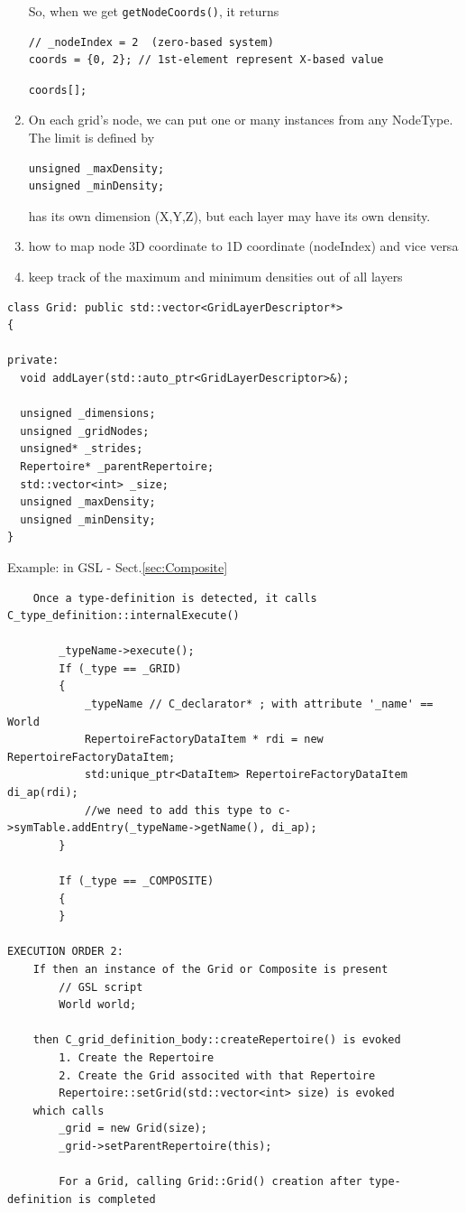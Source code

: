 \begin{enumerate}
  So, when we get \verb!getNodeCoords()!, it returns 
\begin{verbatim}
// _nodeIndex = 2  (zero-based system)
coords = {0, 2}; // 1st-element represent X-based value
\end{verbatim}
  
\begin{verbatim}
coords[];  
\end{verbatim}

  \item On each grid's node, we can put one or many instances from any NodeType.
  The limit is defined by
  
\begin{verbatim}
unsigned _maxDensity;
unsigned _minDensity;
\end{verbatim}  
  
  has its own dimension (X,Y,Z), 
  but each layer may have its own density.
  
  \item how to map node 3D coordinate to 1D coordinate (nodeIndex) and vice
  versa
  
  \item keep track of the maximum and minimum densities out of all layers

\end{enumerate}

\begin{verbatim}
class Grid: public std::vector<GridLayerDescriptor*> 
{

private:
  void addLayer(std::auto_ptr<GridLayerDescriptor>&);

  unsigned _dimensions;
  unsigned _gridNodes;
  unsigned* _strides;
  Repertoire* _parentRepertoire;
  std::vector<int> _size;
  unsigned _maxDensity;
  unsigned _minDensity;
}
\end{verbatim}


Example: in GSL - Sect.\ref{sec:Composite}

\begin{verbatim}
	Once a type-definition is detected, it calls C_type_definition::internalExecute()

		_typeName->execute();
		If (_type == _GRID)
		{
			_typeName // C_declarator* ; with attribute '_name' == World
			RepertoireFactoryDataItem * rdi = new RepertoireFactoryDataItem;
			std:unique_ptr<DataItem> RepertoireFactoryDataItem di_ap(rdi);
			//we need to add this type to c->symTable.addEntry(_typeName->getName(), di_ap);
		}
		
		If (_type == _COMPOSITE)
		{
		}
		
EXECUTION ORDER 2:
	If then an instance of the Grid or Composite is present
		// GSL script
		World world;
		
	then C_grid_definition_body::createRepertoire() is evoked
		1. Create the Repertoire
		2. Create the Grid associted with that Repertoire
		Repertoire::setGrid(std::vector<int> size) is evoked
	which calls
		_grid = new Grid(size);
		_grid->setParentRepertoire(this);
		
		For a Grid, calling Grid::Grid() creation after type-definition is completed

\end{verbatim}


